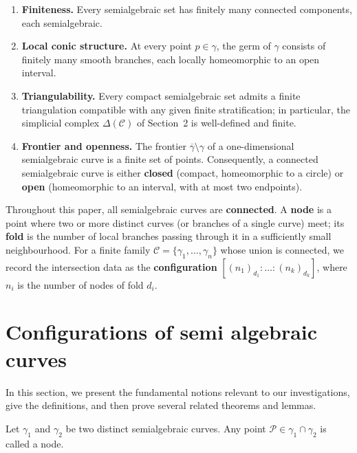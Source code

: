 \documentclass[article,11pt]{amsart} \numberwithin{equation}{section}
\numberwithin{equation}{section}
\begin{document}
{\begin{enumerate}
	\item[(S1)] \textbf{Finiteness.} Every semialgebraic set has finitely many 
	connected components, each semialgebraic.
	
	\item[(S2)] \textbf{Local conic structure.} At every point $p \in \gamma$, 
	the germ of $\gamma$ consists of finitely many smooth branches, each locally 
	homeomorphic to an open interval.
	
	\item[(S3)] \textbf{Triangulability.} Every compact semialgebraic set admits 
	a finite triangulation compatible with any given finite stratification; in 
	particular, the simplicial complex $\Delta(\mathcal{C})$ of Section~2 is 
	well-defined and finite.
	
	\item[(S4)] \textbf{Frontier and openness.} The frontier 
	$\overline{\gamma} \setminus \gamma$ of a one-dimensional semialgebraic curve 
	is a finite set of points. Consequently, a connected semialgebraic curve is 
	either \textbf{closed} (compact, homeomorphic to a circle) or \textbf{open} 
	(homeomorphic to an interval, with at most two endpoints).
\end{enumerate}

Throughout this paper, all semialgebraic curves are \textbf{connected}. 
A \textbf{node} is a point where two or more distinct curves (or branches of 
a single curve) meet; its \textbf{fold} is the number of local branches passing 
through it in a sufficiently small neighbourhood. For a finite family 
$\mathcal{C} = \{\gamma_1, \dots, \gamma_n\}$ whose union is connected, we 
record the intersection data as the \textbf{configuration} 
$[(n_1)_{d_1} : \dots : (n_k)_{d_k}]$, where $n_i$ is the number of nodes of 
fold $d_i$.

\section {Configurations of semi algebraic curves}\label{sec:configurations}
In this section, we present the fundamental notions relevant to our investigations, give the definitions, and then prove several related theorems and lemmas.
\newline

\begin{df}[Node]
	Let $\mathcal{ \gamma}_1$ and $\mathcal{ \gamma}_2$ be two distinct semialgebraic curves. Any point $ \mathcal{P} \in \mathcal{ \gamma}_1 \cap \mathcal{ \gamma}_2 $ is called a node.
\end{df}

}
\end{document}
